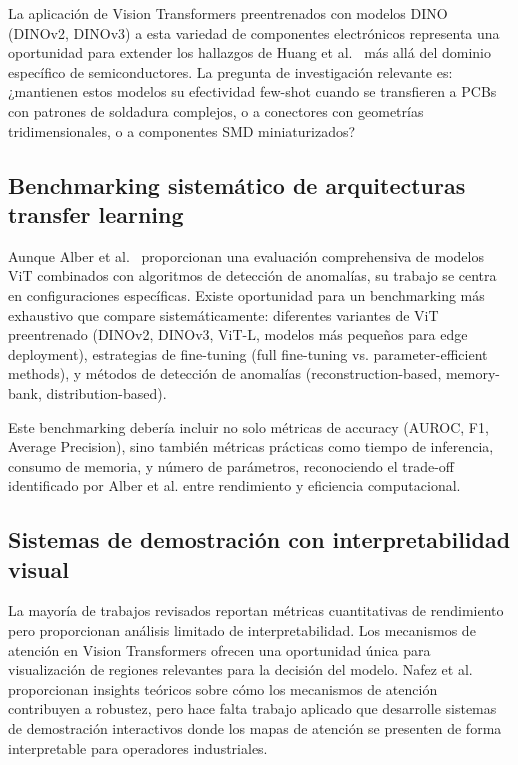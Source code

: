 La aplicación de Vision Transformers preentrenados con modelos DINO (DINOv2, DINOv3) a esta variedad de componentes electrónicos representa una oportunidad para extender los hallazgos de Huang et al.~\cite{huang2025semiconductor} más allá del dominio específico de semiconductores. La pregunta de investigación relevante es: ¿mantienen estos modelos su efectividad few-shot cuando se transfieren a PCBs con patrones de soldadura complejos, o a conectores con geometrías tridimensionales, o a componentes SMD miniaturizados?

\subsection{Benchmarking sistemático de arquitecturas transfer learning}

Aunque Alber et al.~\cite{alber2024evaluating} proporcionan una evaluación comprehensiva de modelos ViT combinados con algoritmos de detección de anomalías, su trabajo se centra en configuraciones específicas. Existe oportunidad para un benchmarking más exhaustivo que compare sistemáticamente: diferentes variantes de ViT preentrenado (DINOv2, DINOv3, ViT-L, modelos más pequeños para edge deployment), estrategias de fine-tuning (full fine-tuning vs. parameter-efficient methods), y métodos de detección de anomalías (reconstruction-based, memory-bank, distribution-based).

Este benchmarking debería incluir no solo métricas de accuracy (AUROC, F1, Average Precision), sino también métricas prácticas como tiempo de inferencia, consumo de memoria, y número de parámetros, reconociendo el trade-off identificado por Alber et al. entre rendimiento y eficiencia computacional.

\subsection{Sistemas de demostración con interpretabilidad visual}

La mayoría de trabajos revisados reportan métricas cuantitativas de rendimiento pero proporcionan análisis limitado de interpretabilidad. Los mecanismos de atención en Vision Transformers ofrecen una oportunidad única para visualización de regiones relevantes para la decisión del modelo. Nafez et al.~\cite{nafez2025patchguard} proporcionan insights teóricos sobre cómo los mecanismos de atención contribuyen a robustez, pero hace falta trabajo aplicado que desarrolle sistemas de demostración interactivos donde los mapas de atención se presenten de forma interpretable para operadores industriales.

